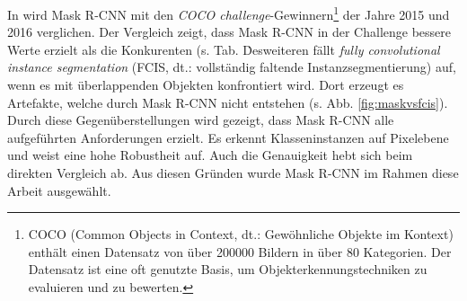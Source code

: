 \noindent
In \cite{ref:maskrcnn} wird Mask R-CNN mit den \textit{COCO challenge}-Gewinnern\footnote{COCO (Common Objects in Context, dt.: Gewöhnliche Objekte im Kontext) enthält einen Datensatz von über 200000 Bildern in über 80 Kategorien. Der Datensatz ist eine oft genutzte Basis, um Objekterkennungstechniken zu evaluieren und zu bewerten.\cite{ref:coco}} der Jahre 2015 und 2016 verglichen. Der Vergleich zeigt, dass Mask R-CNN in der Challenge bessere Werte erzielt als die Konkurenten (s. Tab. \. Desweiteren fällt \textit{fully convolutional instance segmentation} (FCIS, dt.: vollständig faltende Instanzsegmentierung) auf, wenn es mit überlappenden Objekten konfrontiert wird. Dort erzeugt es Artefakte, welche durch Mask R-CNN nicht entstehen (s. Abb. \ref{fig:maskvsfcis}). Durch diese Gegenüberstellungen wird gezeigt, dass Mask R-CNN alle aufgeführten Anforderungen erzielt. Es erkennt Klasseninstanzen auf Pixelebene und weist eine hohe Robustheit auf. Auch die Genauigkeit hebt sich beim direkten Vergleich ab. Aus diesen Gründen wurde Mask R-CNN im Rahmen diese Arbeit ausgewählt.

